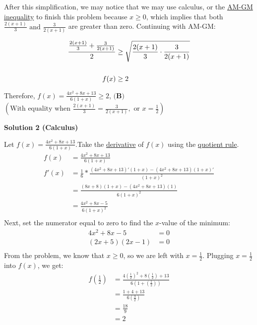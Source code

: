 \begin{enumerate}
 After this simplification, we may notice that we may use calculus, or the \href{https://artofproblemsolving.com/wiki/index.php?title=AM-GM\_inequality}{AM-GM inequality} to finish this problem because $x\ge 0$, which implies that both $\frac{2(x+1)}{3} \text{ and } \frac{3}{2(x+1)}$ are greater than zero. Continuing with AM-GM:

 
 \begin{align*} \frac{\frac{2(x+1)}{3} + \frac{3}{2(x+1)}}{2} &\ge {\small \sqrt{\frac{2(x+1)}{3}\cdot \frac{3}{2(x+1)}}}\\\\ f(x) &\ge 2 \end{align*}


 Therefore, $f(x) = \frac {4x^2 + 8x + 13}{6(1 + x)} \ge 2$, $\boxed{\textbf{(B)}}$
$(\text{With equality when } \frac{2(x+1)}{3} = \frac{3}{2(x+1)}, \text{ or } x=\frac{1}{2})$




\textbf{Solution 2 (Calculus)}

Let $f(x)=\frac{4x^2 + 8x + 13}{6(1 + x)}$.Take the \href{https://artofproblemsolving.com/wiki/index.php?title=Derivative}{derivative} of $f(x)$ using the \href{https://artofproblemsolving.com/wiki/index.php?title=Quotient\_rule}{quotient rule}.\begin{align*} f(x) &= \frac{4x^2 + 8x + 13}{6(1 + x)} \\f'(x) &= \frac{1}{6}*\frac{(4x^2 + 8x + 13)'(1 + x) - (4x^2 + 8x + 13)(1 + x)'}{(1 + x)^2} \\&= \frac{(8x + 8)(1 + x) - (4x^2 + 8x + 13)(1)}{6(1 + x)^2} \\&= \frac{4x^2 + 8x - 5}{6(1 + x)^2} \\\end{align*}
Next, set the numerator equal to zero to find the $x$-value of the minimum:\begin{align*}4x^2+8x-5 &= 0 \\ (2x+5)(2x-1) &= 0 \\\end{align*}
From the problem, we know that $x \geq 0$, so we are left with $x=\frac{1}{2}$. Plugging $x=\frac{1}{2}$ into $f(x)$, we get:\begin{align*}f(\frac{1}{2})&=\frac{4(\frac{1}{2})^2+8(\frac{1}{2})+13}{6(1+(\frac{1}{2}))} \\&=\frac{1+4+13}{6(\frac{3}{2})} \\&=\frac{18}{9} \\&=2 \\\end{align*}



\end{enumerate}
